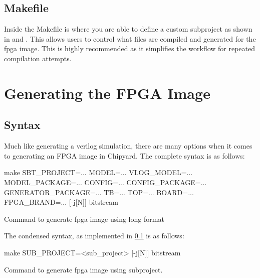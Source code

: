 \subsection{Makefile}\label{sec:Customizing_FPGA-Makefile}
Inside the Makefile is where you are able to define a custom subproject as shown in  and .
This allows users to control what files are compiled and generated for the \Gls{fpga} image.
This is highly recommended as it simplifies the workflow for repeated compilation attempts.

\section{Generating the FPGA Image}\label{sec:Generating_FPGA_Image}

\subsection{Syntax}\label{sec:Generating_FPGA_Image-Syntax}
Much like generating a verilog simulation, there are many options when it comes to generating an FPGA image in Chipyard.
The complete syntax is as follows:~\cite{Chipyard_Prototyping}

\begin{listing}[h!tbp]
  \begin{bashsource}
    make SBT_PROJECT=... MODEL=... VLOG_MODEL=... MODEL_PACKAGE=... CONFIG=... CONFIG_PACKAGE=... GENERATOR_PACKAGE=... TB=... TOP=... BOARD=... FPGA_BRAND=... [-j[N]] bitstream
  \end{bashsource}
  \caption{Command to generate \Gls{fpga} image using long format}
  \label{lst:extended_fpga_cmd}
\end{listing}

The condensed syntax, as implemented in \cref{sec:Customizing_FPGA-Makefile} is as follows:

\begin{listing}[h!tbp]
  \begin{bashsource}
    make SUB_PROJECT=<sub_project> [-j[N]] bitstream
  \end{bashsource}
  \caption{Command to generate \Gls{fpga} image using subproject.}
  \label{lst:condensed_fpga_cmd}
\end{listing}

